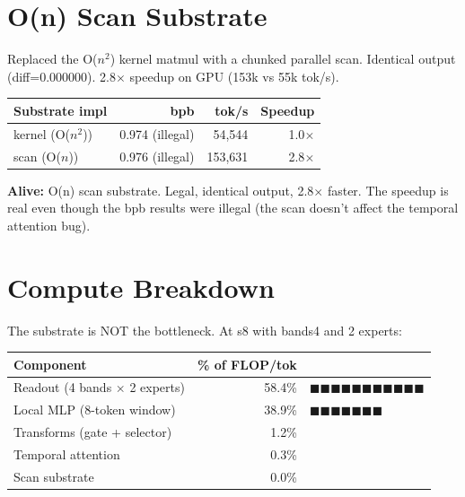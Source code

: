\documentclass[11pt,a4paper]{report}
\newcommand{\alive}[1]{\textcolor{alive}{\textbf{Alive:}} #1}
\begin{document}
\section{O(n) Scan Substrate}

Replaced the O($n^2$) kernel matmul with a chunked parallel scan. Identical output (diff=0.000000). 2.8$\times$ speedup on GPU (153k vs 55k tok/s).

\begin{table}[h]
\centering
\begin{tabular}{lrrr}
\toprule
\textbf{Substrate impl} & \textbf{bpb} & \textbf{tok/s} & \textbf{Speedup} \\
\midrule
kernel (O($n^2$)) & 0.974 (illegal) & 54,544 & 1.0$\times$ \\
scan (O($n$)) & 0.976 (illegal) & 153,631 & 2.8$\times$ \\
\bottomrule
\end{tabular}
\end{table}

\alive{O(n) scan substrate. Legal, identical output, 2.8$\times$ faster. The speedup is real even though the bpb results were illegal (the scan doesn't affect the temporal attention bug).}

\section{Compute Breakdown}

The substrate is NOT the bottleneck. At s8 with bands4 and 2 experts:

\begin{table}[h]
\centering
\begin{tabular}{lrl}
\toprule
\textbf{Component} & \textbf{\% of FLOP/tok} & \\
\midrule
Readout (4 bands $\times$ 2 experts) & 58.4\% & $\blacksquare\blacksquare\blacksquare\blacksquare\blacksquare\blacksquare\blacksquare\blacksquare\blacksquare\blacksquare\blacksquare$ \\
Local MLP (8-token window) & 38.9\% & $\blacksquare\blacksquare\blacksquare\blacksquare\blacksquare\blacksquare\blacksquare$ \\
Transforms (gate + selector) & 1.2\% & \\
Temporal attention & 0.3\% & \\
Scan substrate & 0.0\% & \\
\bottomrule
\end{tabular}
\end{table}
\end{document}
